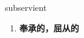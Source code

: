 
\begin{frame}
{\huge subservient}
\begin{center}
\begin{enumerate}\Large
  \item \textbf{奉承的，屈从的}
\end{enumerate}
\end{center}
\end{frame}
